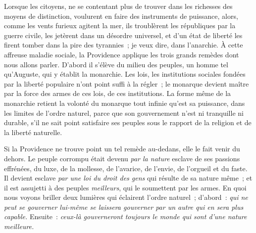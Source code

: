 \documentclass[french,twoside]{book} %
\begin{document}
 Lorsque les citoyens, ne se contentant plus de trouver dans les richesses des moyens de distinction, voulurent en faire des instruments de puissance, alors, comme les vents furieux agitent la mer, ils troublèrent les républiques par la guerre civile, les jetèrent dans un désordre universel, et d’un état de liberté les firent tomber dans la pire des tyrannies ; je veux dire, dans l’anarchie. À cette affreuse maladie sociale, la Providence applique les trois grands remèdes dont nous allons parler. D’abord il s’élève du milieu des peuples, un homme tel qu’Auguste, qui y établit la monarchie. Les lois, les institutions sociales fondées par la liberté populaire n’ont point suffi à la régler ; le monarque devient maître par la force des armes de ces lois, de ces institutions. La forme même de la monarchie retient la volonté du monarque tout infinie qu’est sa puissance, dans les limites de l’ordre naturel, parce que son gouvernement n’est ni tranquille ni durable, s’il ne sait point satisfaire ses peuples  sous le rapport de la religion et de la liberté naturelle.\par
Si la Providence ne trouve point un tel remède au-dedans, elle le fait venir du dehors. Le peuple corrompu était devenu {\itshape par la nature} esclave de ses passions effrénées, du luxe, de la mollesse, de l’avarice, de l’envie, de l’orgueil et du faste. Il devient esclave {\itshape par une loi du droit des gens} qui résulte de sa nature même ; et il est assujetti à des peuples {\itshape meilleurs}, qui le soumettent par les armes. En quoi nous voyons briller deux lumières qui éclairent l’ordre naturel ; d’abord : {\itshape qui ne peut se gouverner lui-même se laissera gouverner par un autre qui en sera plus capable.} Ensuite : {\itshape ceux-là gouverneront toujours le monde qui sont d’une nature meilleure.}\par
\end{document}
